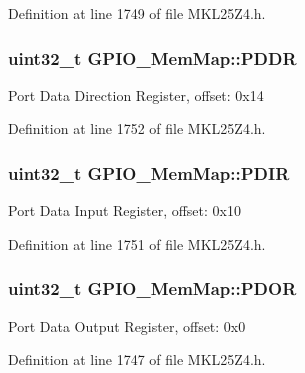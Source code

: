 Definition at line 1749 of file M\+K\+L25\+Z4.\+h.

\subsubsection[{\texorpdfstring{P\+D\+DR}{PDDR}}]{\setlength{\rightskip}{0pt plus 5cm}uint32\+\_\+t G\+P\+I\+O\+\_\+\+Mem\+Map\+::\+P\+D\+DR}\hypertarget{struct_g_p_i_o___mem_map_a49dfaa95d08fa9178dd7f098c87f562d}{}\label{struct_g_p_i_o___mem_map_a49dfaa95d08fa9178dd7f098c87f562d}
Port Data Direction Register, offset\+: 0x14 

Definition at line 1752 of file M\+K\+L25\+Z4.\+h.

\subsubsection[{\texorpdfstring{P\+D\+IR}{PDIR}}]{\setlength{\rightskip}{0pt plus 5cm}uint32\+\_\+t G\+P\+I\+O\+\_\+\+Mem\+Map\+::\+P\+D\+IR}\hypertarget{struct_g_p_i_o___mem_map_a01933bea5d005bf126ea2e0345518763}{}\label{struct_g_p_i_o___mem_map_a01933bea5d005bf126ea2e0345518763}
Port Data Input Register, offset\+: 0x10 

Definition at line 1751 of file M\+K\+L25\+Z4.\+h.

\subsubsection[{\texorpdfstring{P\+D\+OR}{PDOR}}]{\setlength{\rightskip}{0pt plus 5cm}uint32\+\_\+t G\+P\+I\+O\+\_\+\+Mem\+Map\+::\+P\+D\+OR}\hypertarget{struct_g_p_i_o___mem_map_aaf4f486952b9b4680e270ce6266122fd}{}\label{struct_g_p_i_o___mem_map_aaf4f486952b9b4680e270ce6266122fd}
Port Data Output Register, offset\+: 0x0 

Definition at line 1747 of file M\+K\+L25\+Z4.\+h.


